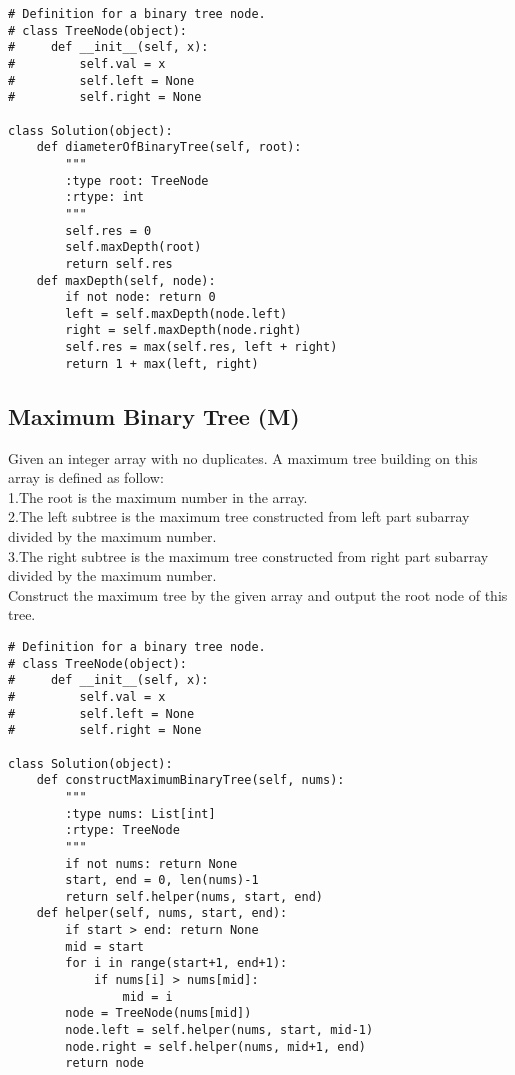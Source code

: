 \begin{lstlisting}
# Definition for a binary tree node.
# class TreeNode(object):
#     def __init__(self, x):
#         self.val = x
#         self.left = None
#         self.right = None

class Solution(object):
    def diameterOfBinaryTree(self, root):
        """
        :type root: TreeNode
        :rtype: int
        """
        self.res = 0
        self.maxDepth(root)
        return self.res
    def maxDepth(self, node):
        if not node: return 0
        left = self.maxDepth(node.left)
        right = self.maxDepth(node.right)
        self.res = max(self.res, left + right)
        return 1 + max(left, right)
\end{lstlisting}


\subsection{Maximum Binary Tree (M)}
Given an integer array with no duplicates. A maximum tree building on this array is defined as follow:\\

1.The root is the maximum number in the array.\\
2.The left subtree is the maximum tree constructed from left part subarray divided by the maximum number.\\
3.The right subtree is the maximum tree constructed from right part subarray divided by the maximum number.\\

Construct the maximum tree by the given array and output the root node of this tree. \\

\begin{lstlisting}
# Definition for a binary tree node.
# class TreeNode(object):
#     def __init__(self, x):
#         self.val = x
#         self.left = None
#         self.right = None

class Solution(object):
    def constructMaximumBinaryTree(self, nums):
        """
        :type nums: List[int]
        :rtype: TreeNode
        """
        if not nums: return None
        start, end = 0, len(nums)-1
        return self.helper(nums, start, end)
    def helper(self, nums, start, end):
        if start > end: return None
        mid = start
        for i in range(start+1, end+1):
            if nums[i] > nums[mid]:
                mid = i
        node = TreeNode(nums[mid])
        node.left = self.helper(nums, start, mid-1)
        node.right = self.helper(nums, mid+1, end)
        return node
\end{lstlisting}


